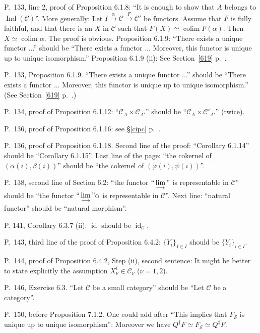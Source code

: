 \documentclass[12pt]{article}
\theoremstyle{remark}
\theoremstyle{definition}
\newcommand{\C}{\mathcal C}
\newcommand{\SSS}{\mathcal S}
\DeclareMathOperator*{\coli}{colim}
\DeclareMathOperator{\id}{id}
\DeclareMathOperator{\Ind}{Ind}
\begin{document}
\noindent P.~133, line 2, proof of Proposition 6.1.8: ``It is enough to show that $A$ belongs to $\Ind(\C)$''. More generally: Let $I\xrightarrow{\alpha}\C\xrightarrow{F}\C'$ be functors. Assume that $F$ is fully faithful, and that there is an $X$ in $\C$ such that $F(X)\simeq\coli F(\alpha)$. Then $X\simeq\coli\alpha$. The proof is obvious. Proposition 6.1.9: ``There exists a unique functor ...'' should be ``There exists a functor ... Moreover, this functor is unique up to unique isomorphism.'' Proposition 6.1.9 (ii): See Section~\ref{619} p.~\pageref{619}.

\noindent P.~133, Proposition 6.1.9. ``There exists a unique functor ...'' should be ``There exists a functor ... Moreover, this functor is unique up to unique isomorphism.'' (See Section~\ref{619} p.~\pageref{619}.)

\noindent P.~134, proof of Proposition 6.1.12: ``$\C_A\times\C_{A'}$'' should be ``$\C_A\times\C'_{A'}$'' (twice).

\noindent P.~136, proof of Proposition 6.1.16: see \S\ref{cipc} p.~\pageref{cipc}.

\noindent P.~136, proof of Proposition 6.1.18. Second line of the proof: ``Corollary 6.1.14'' should be ``Corollary 6.1.15''. Last line of the page: ``the cokernel of $(\alpha(i),\beta(i))$'' should be ``the cokernel of $(\varphi(i),\psi(i))$''.

\noindent P.~138, second line of Section 6.2: ``the functor $``\displaystyle\lim_{\longrightarrow}"$ is representable in $\C$'' should be ``the functor $``\displaystyle\lim_{\longrightarrow}"\alpha$ is representable in $\C$''. Next line: ``natural functor'' should be ``natural morphism''.

\noindent P. 141, Corollary 6.3.7 (ii): $\id$ should be $\id_\C$.

\noindent P.~143, third line of the proof of Proposition 6.4.2: $\{Y_i\}_{I\in I}$ should be $\{Y_i\}_{i\in I}$. 

\noindent P.~144, proof of Proposition 6.4.2, Step (ii), second sentence: It might be better to state explicitly the assumption $X_\nu^i\in\C_\nu$ ($\nu=1,2$). 

\noindent P.~146, Exercise 6.3. ``Let $\C$ be a small category'' should be ``Let $\C$ be a category''. 

\noindent P.~150, before Proposition 7.1.2. One could add after ``This implies that $F_{\SSS}$ is unique up to unique isomorphism'': Moreover we have $Q^\dagger F\simeq F_{\SSS}\simeq Q^\ddagger F$. 
\end{document}
